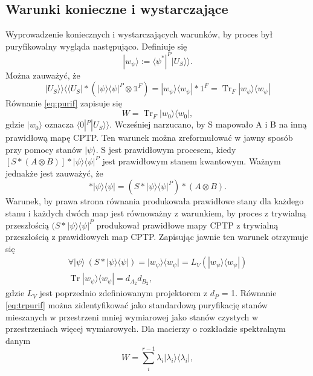 \documentclass[10pt]{article} %
\DeclareMathOperator{\Trs}{Tr}
\newcommand{\Ket}[1]{|#1\rangle}
\newcommand{\Bra}[1]{\langle#1|}
\newcommand{\BBra}[1]{\langle\langle#1|}
\newcommand{\KKet}[1]{|#1\rangle\rangle}
\newcommand{\KP}{\Ket{\psi}}
\newcommand{\BP}{\Bra{\psi}}
\newcommand{\I}{\mathbb{1}}
\begin{document}
\subsection{Warunki konieczne i wystarczające}
Wyprowadzenie koniecznych i wystarczających warunków, by proces był puryfikowalny wygląda następująco.
Definiuje się
\begin{equation}
\label{eq:purif}
\Ket{w_\psi}:= \Bra{\psi^*}^P \KKet{U_S}.
\end{equation}
Można zauważyć, że
\begin{equation}
\KKet{U_S} \BBra{U_S} * (\Ket{\psi}\Bra{\psi}^P \otimes \I^F) = \Ket{w_\psi} \Bra{w_\psi} * 1^F = \Trs_F \Ket{w_\psi} \Bra{w_\psi}
\end{equation}
Równanie \eqref{eq:purif} zapisuje się
\begin{equation}
\label{eq:trpurif}
W = \Trs_F \Ket{w_0}\Bra{w_0},
\end{equation}
gdzie $\Ket{w_0}$ oznacza $\Bra{0}^P\KKet{U_S}$.
Wcześniej narzucano, by S mapowało A i B na inną prawidłową mapę CPTP.
Ten warunek można zreformułować w jawny sposób przy pomocy stanów $\Ket{\psi}$.
S jest prawidłowym procesem, kiedy $[ S * (A \otimes B)] * \Ket{\psi}\Bra{\psi}^P$ jest prawidłowym stanem kwantowym.
Ważnym jednakże jest zauważyć, że
\begin{equation}
[S * (A \otimes B)] * \Ket{\psi}\Bra{\psi} = (S * \KP \BP^P) * (A \otimes B).
\end{equation}
Warunek, by prawa strona równania produkowała prawidłowe stany dla każdego stanu i każdych dwóch map jest równoważny z warunkiem, by proces z trywialną przeszłością $(S*\Ket{\psi}\Bra{\psi}^P$ produkował prawidłowe mapy CPTP z trywialną przeszłością z prawidłowych map CPTP.
Zapisując jawnie ten warunek otrzymuje się
\begin{gather}
\forall \Ket{\psi} ~(S * \KP \BP) = \Ket{w_\psi}\Bra{w_\psi} = L_V(\Ket{w_\psi}\Bra{w_\psi}) \nonumber \\
\label{eq:purifproj}
 \Trs \Ket{w_\psi} \Bra{w_\psi} = d_{A_2}d_{B_2},
\end{gather}
gdzie $L_V$ jest poprzednio zdefiniowanym projektorem z $d_P$ = 1.
Równanie \eqref{eq:trpurif} można zidentyfikować jako standardową puryfikację stanów mieszanych w przestrzeni mniej wymiarowej jako stanów
czystych w przestrzeniach więcej wymiarowych. Dla macierzy o rozkładzie spektralnym danym
\begin{equation}
W = \sum^{r-1}_i \lambda_i \Ket{\lambda_i}\Bra{\lambda_i},
\end{equation}
\end{document}
